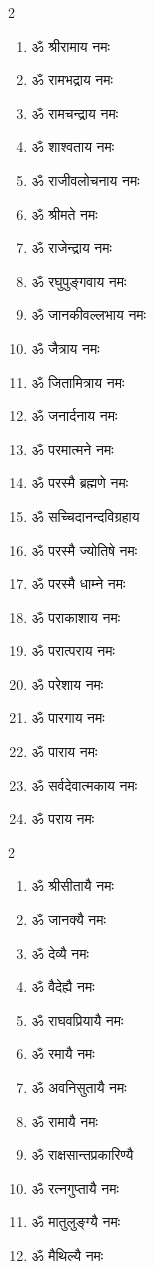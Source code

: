 \begin{center}
\begin{multicols}{2}
\begin{enumerate}
\item ॐ श्रीरामाय नमः
\item ॐ रामभद्राय नमः
\item ॐ रामचन्द्राय नमः
\item ॐ शाश्वताय नमः
\item ॐ राजीवलोचनाय नमः
\item ॐ श्रीमते नमः
\item ॐ राजेन्द्राय नमः
\item ॐ रघुपुङ्गवाय नमः
\item ॐ जानकीवल्लभाय नमः
\item ॐ जैत्राय नमः
\item ॐ जितामित्राय नमः
\item ॐ जनार्दनाय नमः
\item ॐ परमात्मने नमः
\item ॐ परस्मै ब्रह्मणे नमः
\item ॐ सच्चिदानन्दविग्रहाय
\item ॐ परस्मै ज्योतिषे नमः
\item ॐ परस्मै धाम्ने नमः
\item ॐ पराकाशाय नमः
\item ॐ परात्पराय नमः
\item ॐ परेशाय नमः
\item ॐ पारगाय नमः
\item ॐ पाराय नमः
\item ॐ सर्वदेवात्मकाय नमः
\item ॐ पराय नमः
\end{enumerate}
\end{multicols}


\begin{multicols}{2}
\begin{enumerate}
\item ॐ श्रीसीतायै नमः
\item ॐ जानक्यै नमः
\item ॐ देव्यै नमः
\item ॐ वैदेह्यै नमः
\item ॐ राघवप्रियायै नमः
\item ॐ रमायै नमः
\item ॐ अवनिसुतायै नमः
\item ॐ रामायै नमः
\item ॐ राक्षसान्तप्रकारिण्यै
\item ॐ रत्नगुप्तायै नमः
\item ॐ मातुलुङ्ग्यै नमः
\item ॐ मैथिल्यै नमः
\end{enumerate}
\end{multicols}


\end{center}
